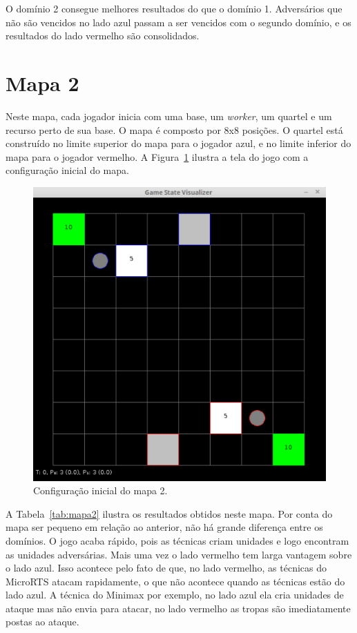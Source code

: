 O domínio 2 consegue melhores resultados do que o domínio 1.
Adversários que não são vencidos no lado azul passam a ser vencidos com o segundo domínio, e os resultados do lado vermelho são consolidados.

\section{Mapa 2}

Neste mapa, cada jogador inicia com uma base, um \textit{worker}, um quartel e um recurso perto de sua base.
O mapa é composto por 8x8 posições.
O quartel está construído no limite superior do mapa para o jogador azul, e no limite inferior do mapa para o jogador vermelho.
A Figura~\ref{fig:mapa8x8quartel} ilustra a tela do jogo com a configuração inicial do mapa.

\begin{figure}[ht]
	\centering
	\includegraphics[width=.5\textwidth]{fig/map8x8quartel.pdf}
	\caption{Configuração inicial do mapa 2.}
	\label{fig:mapa8x8quartel}
\end{figure}

A Tabela~\ref{tab:mapa2} ilustra os resultados obtidos neste mapa.
Por conta do mapa ser pequeno em relação ao anterior, não há grande diferença entre os domínios.
O jogo acaba rápido, pois as técnicas criam unidades e logo encontram as unidades adversárias.
Mais uma vez o lado vermelho tem larga vantagem sobre o lado azul. 
Isso acontece pelo fato de que, no lado vermelho, as técnicas do MicroRTS atacam rapidamente, o que não acontece quando as técnicas estão do lado azul.
A técnica do Minimax por exemplo, no lado azul ela cria unidades de ataque mas não envia para atacar, no lado vermelho as tropas são imediatamente postas ao ataque.

